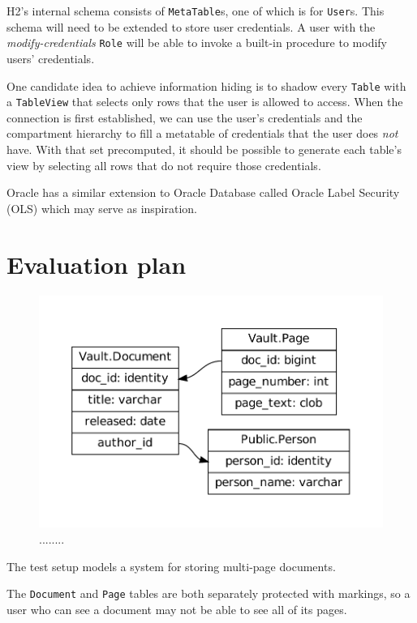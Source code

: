 \documentclass[twocolumn]{article}
\begin{document}
H2's internal schema consists of {\tt MetaTable}s, one of which is for {\tt User}s. This schema will need to be extended to store user credentials. A user with the {\it modify-credentials} {\tt Role} will be able to invoke a built-in procedure to modify users' credentials.

One candidate idea to achieve information hiding is to shadow every {\tt Table} with a {\tt TableView} that selects only rows that the user is allowed to access. When the connection is first established, we can use the user's credentials and the compartment hierarchy to fill a metatable of credentials that the user does {\it not} have. With that set precomputed, it should be possible to generate each table's view by selecting all rows that do not require those credentials.

Oracle has a similar extension to Oracle Database called Oracle Label Security (OLS)\cite{ols} which may serve as inspiration.

\section{Evaluation plan}

\begin{figure}
  \begin{center}
    \includegraphics[width=\linewidth]{test-schema.pdf}
  \end{center}
  \caption{........}

  \label{fig:lattice}
\end{figure}

The test setup models a system for storing multi-page documents.

The {\tt Document} and {\tt Page} tables are both separately protected with markings, so a user who can see a document may not be able to see all of its pages.
\end{document}
